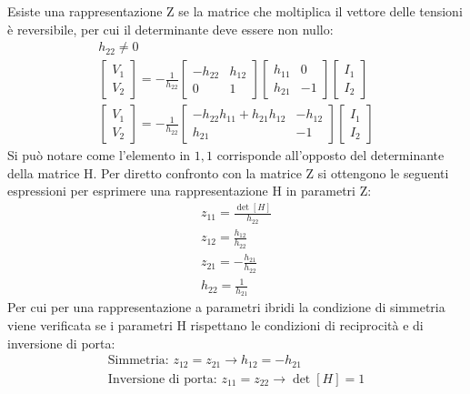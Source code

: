 \documentclass{article}
\numberwithin{equation}{subsection}
\begin{document}
Esiste una rappresentazione Z se la matrice che moltiplica il vettore delle tensioni è reversibile, per cui il determinante deve essere non nullo:
\begin{gather*}
    h_{22}\neq0\\
    \begin{bmatrix}
        V_1\\V_2
    \end{bmatrix}=\displaystyle-\frac{1}{h_{22}}\begin{bmatrix}
        -h_{22}&h_{12}\\0&1
    \end{bmatrix}\begin{bmatrix}
        h_{11}&0\\h_{21}&-1
    \end{bmatrix}\begin{bmatrix}
        I_1\\I_2
    \end{bmatrix}\\
    \begin{bmatrix}
        V_1\\V_2
    \end{bmatrix}=\displaystyle-\frac{1}{h_{22}}\begin{bmatrix}
        -h_{22}h_{11}+h_{21}h_{12}&-h_{12}\\h_{21}&-1
    \end{bmatrix}\begin{bmatrix}
        I_1\\I_2
    \end{bmatrix}
\end{gather*}
Si può notare come l'elemento in $1,1$ corrisponde all'opposto del determinante della matrice H. Per diretto confronto con la matrice Z si ottengono le seguenti espressioni 
per esprimere una rappresentazione H in parametri Z:
\begin{gather*}
    z_{11}=\displaystyle\frac{\det[H]}{h_{22}}\\
    z_{12}=\displaystyle\frac{h_{12}}{h_{22}}\\
    z_{21}=\displaystyle-\frac{h_{21}}{h_{22}}\\
    h_{22}=\displaystyle\frac{1}{h_{21}}
\end{gather*}
Per cui per una rappresentazione a parametri ibridi la condizione di simmetria viene verificata se i parametri H rispettano le condizioni di reciprocità e di inversione 
di porta:
\begin{gather*}
    \mbox{Simmetria: }z_{12}=z_{21}\to h_{12}=-h_{21}\\
    \mbox{Inversione di porta: }z_{11}=z_{22}\to\det[H]=1
\end{gather*}
\end{document}
